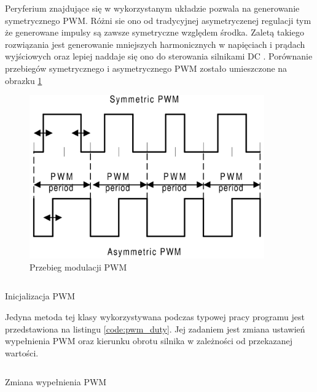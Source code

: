             Peryferium znajdujące się w wykorzystanym układzie pozwala na generowanie symetrycznego PWM. Różni sie ono od tradycyjnej asymetryczenej regulacji tym że generowane impulsy są zawsze symetryczne względem środka. Zaletą takiego rozwiązania jest generowanie mniejszych harmonicznych w napięciach i prądach wyjściowych oraz lepiej naddaje się ono do sterowania silnikami DC \cite{pwm_center}. Porównanie przebiegów symetrycznego i asymetrycznego PWM zostało umieszczone na obrazku \ref{fig:sym_pwm}
            
            \begin{figure}[ht]
                \centering
                \includegraphics[width=0.9\textwidth]{img/symetric_pwm.png}
                \caption{Przebieg modulacji PWM \cite{pwm_center}}
                \label{fig:sym_pwm}
            \end{figure}   
            
            
        \begin{kod}
          \inputminted[firstline=3,lastline=24]{cpp}{esp/listings/motor_driver.cpp}
          \caption{Inicjalizacja PWM}
          \label{code:pwm_init}
          \vspace{1em}
        \end{kod}
        
        Jedyna metoda tej klasy wykorzystywana podczas typowej pracy programu jest przedstawiona na listingu \ref{code:pwm_duty}. Jej zadaniem jest zmiana ustawień wypełnienia PWM oraz kierunku obrotu silnika w zależności od przekazanej wartości.
        
        \begin{kod}
          \inputminted[firstline=27]{cpp}{esp/listings/motor_driver.cpp}
          \caption{Zmiana wypełnienia PWM}
          \label{code:pwm_duty}
          \vspace{2em}
        \end{kod}